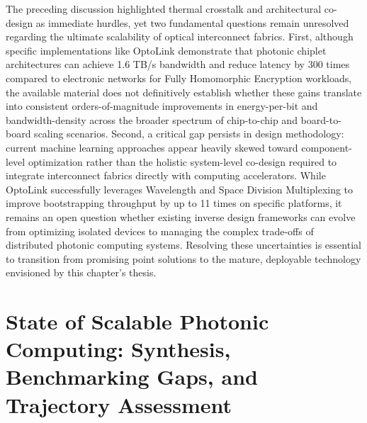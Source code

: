 The preceding discussion highlighted thermal crosstalk and architectural co-design as immediate hurdles, yet two fundamental questions remain unresolved regarding the ultimate scalability of optical interconnect fabrics. First, although specific implementations like OptoLink demonstrate that photonic chiplet architectures can achieve 1.6 TB/s bandwidth and reduce latency by 300 times compared to electronic networks for Fully Homomorphic Encryption workloads, the available material does not definitively establish whether these gains translate into consistent orders-of-magnitude improvements in energy-per-bit and bandwidth-density across the broader spectrum of chip-to-chip and board-to-board scaling scenarios. Second, a critical gap persists in design methodology: current machine learning approaches appear heavily skewed toward component-level optimization rather than the holistic system-level co-design required to integrate interconnect fabrics directly with computing accelerators. While OptoLink successfully leverages Wavelength and Space Division Multiplexing to improve bootstrapping throughput by up to 11 times on specific platforms, it remains an open question whether existing inverse design frameworks can evolve from optimizing isolated devices to managing the complex trade-offs of distributed photonic computing systems. Resolving these uncertainties is essential to transition from promising point solutions to the mature, deployable technology envisioned by this chapter's thesis. \citep{doi_10_1145_3806395_315ab915}

\section{State of Scalable Photonic Computing: Synthesis, Benchmarking Gaps, and Trajectory Assessment}\label{state-of-scalable-photonic-computing-synthesis-benchmarking-gaps-and-trajectory-assessment}

